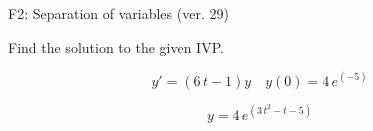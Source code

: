 \begin{exercise}
  \begin{exerciseTitle}F2: Separation of variables (ver. 29)\end{exerciseTitle}
  \begin{exerciseStatement}
    
Find the solution to the given IVP.

    
\[y'=( 6 \, t - 1 )y\hspace{1em} y(0)= 4 \, e^{\left(-5\right)}\]

  \end{exerciseStatement}
  \begin{exerciseAnswer}
    
\[y= 4 \, e^{\left(3 \, t^{2} - t - 5\right)}\]

  \end{exerciseAnswer}
\end{exercise}